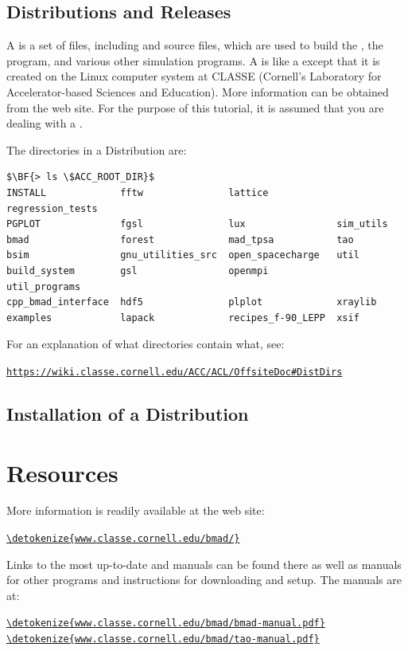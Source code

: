 \documentclass{hitec}     %
\newcommand{\Section}[1]{\section{#1}\vspace*{-1ex}}
\newenvironment{display}
  {\vspace*{-1.5ex} \begin{alltt}}
  {\end{alltt} \vspace*{-1.0ex}}
\begin{document}
\subsection{Distributions and Releases}
\label{s:dist}

A  is a set of files, including \bmad and \tao source files, which are used to
build the \bmad, the \tao program, and various other simulation programs. A  is like a
 except that it is created on the Linux computer system at CLASSE (Cornell's
Laboratory for Accelerator-based Sciences and Education). More information can be obtained from the
\bmad web site. For the purpose of this tutorial, it is assumed that you are dealing with a
.

The directories in a Distribution are:
\begin{lstlisting}[mathescape]
$\BF{> ls \$ACC_ROOT_DIR}$
INSTALL             fftw               lattice            regression_tests
PGPLOT              fgsl               lux                sim_utils
bmad                forest             mad_tpsa           tao
bsim                gnu_utilities_src  open_spacecharge   util
build_system        gsl                openmpi            util_programs
cpp_bmad_interface  hdf5               plplot             xraylib
examples            lapack             recipes_f-90_LEPP  xsif
\end{lstlisting}

For an explanation of what directories contain what, see:
\begin{display}
  \url{https://wiki.classe.cornell.edu/ACC/ACL/OffsiteDoc#DistDirs}
\end{display}

\subsection{Installation of a Distribution}
\label{s:install.dist}


\newpage

\Section{Resources}
\label{s:resources}

More information is readily available at the \bmad web site:
\begin{display}
  \url{\detokenize{www.classe.cornell.edu/bmad/}}
\end{display}
Links to the most up-to-date \bmad and \tao manuals can be found there as well as manuals for other
programs and instructions for downloading and setup. The manuals are at:
\begin{display}
  \url{\detokenize{www.classe.cornell.edu/bmad/bmad-manual.pdf}}
  \url{\detokenize{www.classe.cornell.edu/bmad/tao-manual.pdf}}
\end{display}
\end{document}
